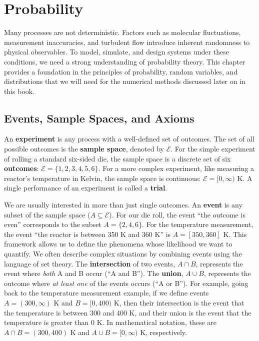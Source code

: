 \chapter{Probability}
Many processes are not deterministic. Factors such as molecular fluctuations, measurement inaccuracies, and turbulent flow introduce inherent randomness to physical observables. To model, simulate, and design systems under these conditions, we need a strong understanding of probability theory. This chapter provides a foundation in the principles of probability, random variables, and distributions that we will need for the numerical methods discussed later on in this book.

\section{Events, Sample Spaces, and Axioms}
An \textbf{experiment} is any process with a well-defined set of outcomes. The set of all possible outcomes is the \textbf{sample space}, denoted by $\mathcal{E}$. For the simple experiment of rolling a standard six-sided die, the sample space is a discrete set of six \textbf{outcomes}: $\mathcal{E} = \{1, 2, 3, 4, 5, 6\}$. For a more complex experiment, like measuring a reactor's temperature in Kelvin, the sample space is continuous: $\mathcal{E} = [0,\infty)$ K. A single performance of an experiment is called a \textbf{trial}.

We are usually interested in more than just single outcomes. An \textbf{event} is any subset of the sample space ($A \subseteq \mathcal{E}$). For our die roll, the event ``the outcome is even'' corresponds to the subset $A = \{2, 4, 6\}$. For the temperature measurement, the event ``the reactor is between 350 K and 360 K'' is $A = [350, 360]$ K. This framework allows us to define the phenomena whose likelihood we want to quantify.  We often describe complex situations by combining events using the language of set theory. The \textbf{intersection} of two events, $A \cap B$, represents the event where \textit{both} A and B occur (``A and B''). The \textbf{union}, $A \cup B$, represents the outcome where \textit{at least one} of the events occurs (``A or B''). For example, going back to the temperature measurement example, if we define events $A = (300, \infty)$ K and $B = [0, 400)$ K, then their intersection is the event that the temperature is between 300 and 400 K, and their union is the event that the temperature is greater than 0 K. In mathematical notation, these are $A \cap B = (300, 400)$ K and $A \cup B = [0, \infty)$ K, respectively.

